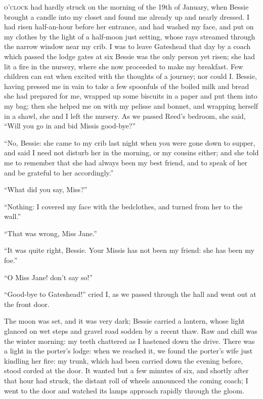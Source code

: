 
 \textsc{o'clock} had hardly struck on the morning of the 19th of January,
when Bessie brought a candle into my closet and found me already up and
nearly dressed. I had risen half-an-hour before her entrance, and had
washed my face, and put on my clothes by the light of a half-moon just
setting, whose rays streamed through the narrow window near my crib. I
was to leave Gateshead that day by a coach which passed the lodge gates
at six \AM{} Bessie was the only person yet risen; she had lit a fire in
the nursery, where she now proceeded to make my breakfast. Few children
can eat when excited with the thoughts of a journey; nor could I\@. 
Bessie, having pressed me in vain to take a few spoonfuls of the boiled
milk and bread she had prepared for me, wrapped up some biscuits in a
paper and put them into my bag; then she helped me on with my pelisse
and bonnet, and wrapping herself in a shawl, she and I left the
nursery. As we passed \Mrs{} Reed's bedroom, she said, \enquote{Will you
go in and bid Missis good-bye?}

\enquote{No, Bessie: she came to my crib last night when you were gone
down to supper, and said I need not disturb her in the morning, or my
cousins either; and she told me to remember that she had always been my
best friend, and to speak of her and be grateful to her accordingly.}

\enquote{What did you say, Miss?}

\enquote{Nothing: I covered my face with the bedclothes, and turned from
her to the wall.}

\enquote{That was wrong, Miss Jane.}

\enquote{It was quite right, Bessie. Your Missis has not been my
friend: she has been my foe.}

\enquote{O Miss Jane! don't say so!}

\enquote{Good-bye to Gateshead!} cried I, as we passed through the hall
and went out at the front door.

The moon was set, and it was very dark; Bessie carried a lantern, whose
light glanced on wet steps and gravel road sodden by a recent thaw. Raw
and chill was the winter morning: my teeth chattered as I hastened down
the drive. There was a light in the porter's lodge: when we reached it,
we found the porter's wife just kindling her fire: my trunk, which had
been carried down the evening before, stood corded at the door. It
wanted but a few minutes of six, and shortly after that hour had struck,
the distant roll of wheels announced the coming coach; I went to the
door and watched its lamps approach rapidly through the gloom.

